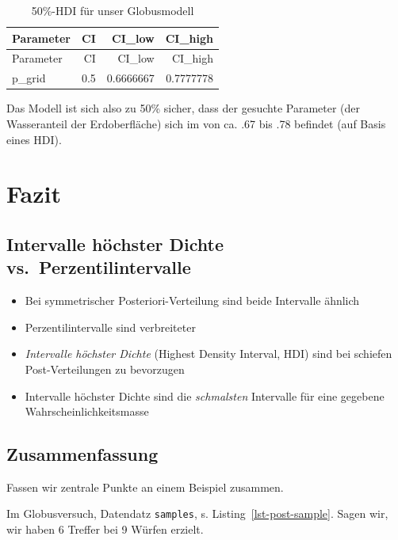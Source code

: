 \documentclass[
  a4paper,
  DIV=11]{scrreprt}
\providecommand{\tightlist}{%
  \setlength{\itemsep}{0pt}\setlength{\parskip}{0pt}}\usepackage{longtable,booktabs,array}
\theoremstyle{definition}
\theoremstyle{remark}
\begin{document}
\hypertarget{tbl-samples-hdi}{}
\begin{longtable}[]{@{}lrrr@{}}
\caption{\label{tbl-samples-hdi}50\%-HDI für unser
Globusmodell}\tabularnewline
\toprule()
Parameter & CI & CI\_low & CI\_high \\
\midrule()
\endfirsthead
\toprule()
Parameter & CI & CI\_low & CI\_high \\
\midrule()
\endhead
p\_grid & 0.5 & 0.6666667 & 0.7777778 \\
\bottomrule()
\end{longtable}

Das Modell ist sich also zu 50\% sicher, dass der gesuchte Parameter
(der Wasseranteil der Erdoberfläche) sich im von ca. .67 bis .78
befindet (auf Basis eines HDI).

\hypertarget{fazit}{%
\section{Fazit}\label{fazit}}

\hypertarget{intervalle-huxf6chster-dichte-vs.-perzentilintervalle}{%
\subsection{Intervalle höchster Dichte
vs.~Perzentilintervalle}\label{intervalle-huxf6chster-dichte-vs.-perzentilintervalle}}

\begin{itemize}
\tightlist
\item
  Bei symmetrischer Posteriori-Verteilung sind beide Intervalle ähnlich
\item
  Perzentilintervalle sind verbreiteter
\item
  \emph{Intervalle höchster Dichte} (Highest Density Interval, HDI) sind
  bei schiefen Post-Verteilungen zu bevorzugen
\item
  Intervalle höchster Dichte sind die \emph{schmalsten} Intervalle für
  eine gegebene Wahrscheinlichkeitsmasse
\end{itemize}

\hypertarget{zusammenfassung-1}{%
\subsection{Zusammenfassung}\label{zusammenfassung-1}}

Fassen wir zentrale Punkte an einem Beispiel zusammen.

Im Globusversuch, Datendatz \texttt{samples}, s.
Listing~\ref{lst-post-sample}. Sagen wir, wir haben 6 Treffer bei 9
Würfen erzielt.
\end{document}
